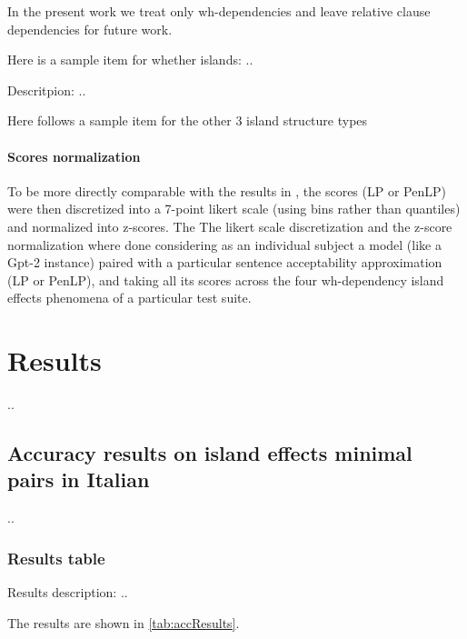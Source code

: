 In the present work we treat only wh-dependencies and leave relative clause dependencies for future work.

Here is a sample item for whether islands:
..

Descritpion: ..

Here follows a sample item for the other 3 island structure types

\subsubsection{Scores normalization}

To be more directly comparable with the results in \citet{sprouse2016experimental}, the scores (LP or PenLP) were then discretized into a 7-point likert scale (using bins rather than quantiles) and normalized into z-scores.
The The likert scale discretization and the z-score normalization where done considering as an individual subject a model (like a Gpt-2 instance) paired with a particular sentence acceptability approximation (LP or PenLP), and taking all its scores across the four wh-dependency island effects phenomena of a particular test suite.

\chapter{Results}
..

\section{Accuracy results on island effects minimal pairs in Italian}
..

\subsection{Results table}

Results description: ..

The results are shown in \autoref{tab:accResults}.

